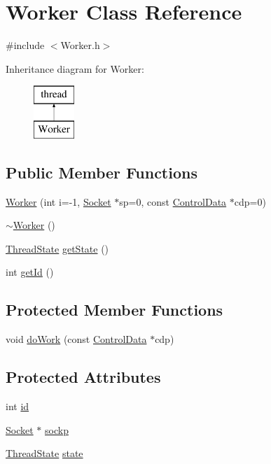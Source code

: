 \hypertarget{classWorker}{}\section{Worker Class Reference}
\label{classWorker}


{\ttfamily \#include $<$Worker.\+h$>$}

Inheritance diagram for Worker\+:\begin{figure}[H]
\begin{center}
\leavevmode
\includegraphics[height=2.000000cm]{classWorker}
\end{center}
\end{figure}
\subsection*{Public Member Functions}
\begin{DoxyCompactItemize}
\item 
\hyperlink{classWorker_a0a75e3ee66254224da70636e3ce40d8e}{Worker} (int i=-\/1, \hyperlink{classSocket}{Socket} $\ast$sp=0, const \hyperlink{structControlData}{Control\+Data} $\ast$cdp=0)
\item 
\hyperlink{classWorker_aa8e4543ef1e93fd9d884269ba30c5bfe}{$\sim$\+Worker} ()
\item 
\hyperlink{Worker_8h_ab3804a8a4369184ad46dadf8e54957b6}{Thread\+State} \hyperlink{classWorker_a2ababbc935eb10458640d2441f5e0c95}{get\+State} ()
\item 
int \hyperlink{classWorker_ac4629e67476bbb1daab8ed28545b8421}{get\+Id} ()
\end{DoxyCompactItemize}
\subsection*{Protected Member Functions}
\begin{DoxyCompactItemize}
\item 
void \hyperlink{classWorker_aeeb8e21ecb6687c34db1ad301028e41b}{do\+Work} (const \hyperlink{structControlData}{Control\+Data} $\ast$cdp)
\end{DoxyCompactItemize}
\subsection*{Protected Attributes}
\begin{DoxyCompactItemize}
\item 
int \hyperlink{classWorker_a50acebd9c077214060ff190bd54d351c}{id}
\item 
\hyperlink{classSocket}{Socket} $\ast$ \hyperlink{classWorker_a4562eb405aea20c7ac8a552e2075898f}{sockp}
\item 
\hyperlink{Worker_8h_ab3804a8a4369184ad46dadf8e54957b6}{Thread\+State} \hyperlink{classWorker_aeb90d4cd08a8a4759749c5388be8c78d}{state}
\end{DoxyCompactItemize}
